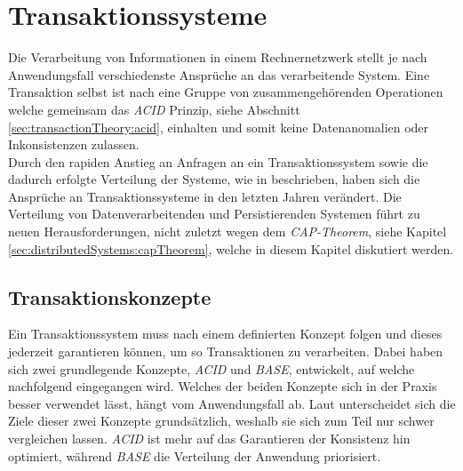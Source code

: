 \chapter{Transaktionssysteme} \label{cha:transactionSystems}
Die Verarbeitung von Informationen in einem Rechnernetzwerk stellt je nach Anwendungsfall verschiedenste Ansprüche an das verarbeitende System. Eine Transaktion selbst ist nach \cite{rahm1993HochleistungsTransaktionssysteme} eine Gruppe von zusammengehörenden Operationen welche gemeinsam das \textit{ACID} Prinzip, siehe Abschnitt \ref{sec:transactionTheory:acid}, einhalten und somit keine Datenanomalien oder Inkonsistenzen zulassen. \\
Durch den rapiden Anstieg an Anfragen an ein Transaktionssystem sowie die dadurch erfolgte Verteilung der Systeme, wie in \cite{li2017research} beschrieben, haben sich die Ansprüche an Transaktionssysteme in den letzten Jahren verändert. Die Verteilung von Datenverarbeitenden und Persistierenden Systemen führt zu neuen Herausforderungen, nicht zuletzt wegen dem \textit{CAP-Theorem}, siehe Kapitel \ref{sec:distributedSystems:capTheorem}, welche in diesem Kapitel diskutiert werden. 

\section{Transaktionskonzepte}
Ein Transaktionssystem muss nach \cite{rahm1993HochleistungsTransaktionssysteme} einem definierten Konzept folgen und dieses jederzeit garantieren können, um so Transaktionen zu verarbeiten. Dabei haben sich zwei grundlegende Konzepte, \textit{ACID} und \textit{BASE}, entwickelt, auf welche nachfolgend eingegangen wird. Welches der beiden Konzepte sich in der Praxis besser verwendet lässt, hängt vom Anwendungsfall ab. Laut \cite{EdlichFriedlandHampeBrauer201010}
% 
% 
% 
unterscheidet sich die Ziele dieser zwei Konzepte grundsätzlich, weshalb sie sich zum Teil nur schwer vergleichen lassen.  \textit{ACID} ist mehr auf das Garantieren der Konsistenz hin optimiert, während \textit{BASE} die Verteilung der Anwendung priorisiert.


